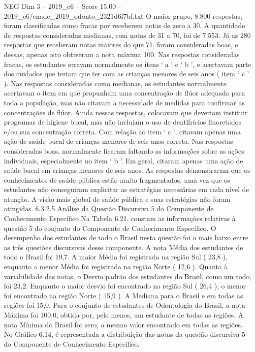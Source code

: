 \begin{textsample}{NEG Dim 3 – 2019\_c6 – Score 15.00 – 2019\_c6/enade\_2019\_odonto\_2321d6f7bf.txt}
O maior grupo, 8.800 respostas, foram classificadas como fracas por receberem notas de zero a 30.
A quantidade de respostas consideradas medianas, com notas de 31 a 70, foi de 7.553.
Já as 280 respostas que receberam notas maiores do que 71, foram consideradas boas, e dessas, apenas oito obtiveram a nota máxima 100.
Nas respostas consideradas fracas, os estudantes erravam normalmente os itens ‘ a ’ e ‘ b ’, e acertavam parte dos cuidados que teriam que ter com as crianças menores de seis anos ( item ‘ c ’ ).
Nas respostas consideradas como medianas, os estudantes normalmente acertavam o item em que propunham uma concentração de flúor adequada para toda a população, mas não citavam a necessidade de medidas para confirmar as concentrações de flúor.
Ainda nessas respostas, colocavam que deveriam instituir programas de higiene bucal, mas não incluíam o uso de dentifrícios fluoretados e/ou sua concentração correta.
Com relação ao item ‘ c ’, citavam apenas uma ação de saúde bucal de crianças menores de seis anos correta.
Nas respostas consideradas boas, normalmente ficaram faltando as informações sobre as ações individuais, especialmente no item ‘ b ’.
Em geral, citaram apenas uma ação de saúde bucal em crianças menores de seis anos.
As respostas demonstraram que os conhecimentos de saúde pública estão muito fragmentados, uma vez que os estudantes não conseguiram explicitar as estratégias necessárias em cada nível de atuação.
A visão mais global de saúde pública e suas estratégias não foram atingidas. 6.3.2.5 Análise da Questão Discursiva 5 do Componente de Conhecimento Específico Na Tabela 6.21, constam as informações relativas à questão 5 do conjunto do Componente de Conhecimento Específico.
O desempenho dos estudantes de todo o Brasil nesta questão foi o mais baixo entre as três questões discursivas desse componente.
A nota Média dos estudantes de todo o Brasil foi 19,7.
A maior Média foi registrada na região Sul ( 23,8 ), enquanto a menor Média foi registrada na região Norte ( 12,6 ).
Quanto à variabilidade das notas, o Desvio padrão dos estudantes do Brasil, como um todo, foi 23,2.
Enquanto o maior desvio foi encontrado na região Sul ( 26,4 ), o menor foi encontrado na região Norte ( 15,9 ).
A Mediana para o Brasil e em todas as regiões foi 15,0.
Para o conjunto de estudantes de Odontologia do Brasil, a nota Máxima foi 100,0, obtida por, pelo menos, um estudante de todas as regiões.
A nota Mínima do Brasil foi zero, o mesmo valor encontrado em todas as regiões.
No Gráfico 6.14, é representada a distribuição das notas da questão discursiva 5 do Componente de Conhecimento Específico.

\end{textsample}
